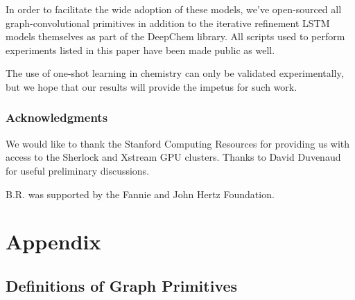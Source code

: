 \documentclass[journal=jacsat,manuscript=article]{achemso}
\begin{document}
In order to facilitate the wide adoption of these models, we've open-sourced all graph-convolutional primitives in addition to the iterative refinement LSTM models themselves as part of the DeepChem library. All scripts used to perform experiments listed in this paper have been made public as well.

The use of one-shot learning in chemistry can only be validated experimentally, but we hope that our results will provide the impetus for such work.

\subsubsection*{Acknowledgments}

We would like to thank the Stanford Computing Resources for providing us with access to the Sherlock and Xstream GPU clusters. Thanks to David Duvenaud for useful preliminary discussions.

B.R. was supported by the Fannie and John Hertz Foundation.

\section{Appendix}

\subsection{Definitions of Graph Primitives}
\end{document}
